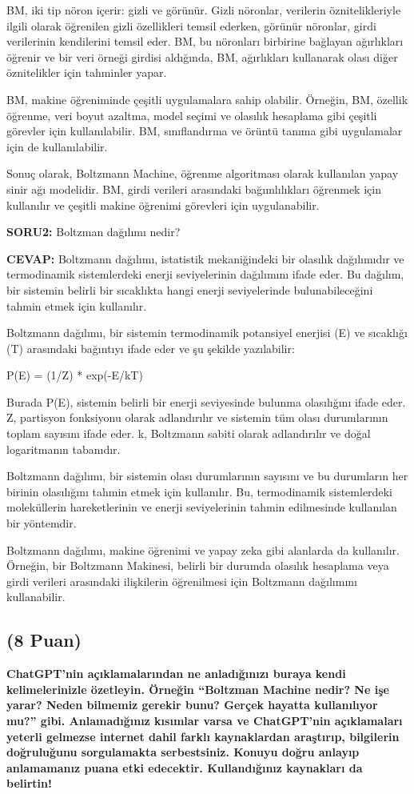 \documentclass[11pt]{article}
\begin{document}
BM, iki tip nöron içerir: gizli ve görünür. Gizli nöronlar, verilerin öznitelikleriyle ilgili olarak öğrenilen gizli özellikleri temsil ederken, görünür nöronlar, girdi verilerinin kendilerini temsil eder. BM, bu nöronları birbirine bağlayan ağırlıkları öğrenir ve bir veri örneği girdisi aldığında, BM, ağırlıkları kullanarak olası diğer öznitelikler için tahminler yapar.

BM, makine öğreniminde çeşitli uygulamalara sahip olabilir. Örneğin, BM, özellik öğrenme, veri boyut azaltma, model seçimi ve olasılık hesaplama gibi çeşitli görevler için kullanılabilir. BM, sınıflandırma ve örüntü tanıma gibi uygulamalar için de kullanılabilir.

Sonuç olarak, Boltzmann Machine, öğrenme algoritması olarak kullanılan yapay sinir ağı modelidir. BM, girdi verileri arasındaki bağımlılıkları öğrenmek için kullanılır ve çeşitli makine öğrenimi görevleri için uygulanabilir.

\textbf{SORU2:} Boltzman dağılımı nedir?

\textbf{CEVAP:} Boltzmann dağılımı, istatistik mekaniğindeki bir olasılık dağılımıdır ve termodinamik sistemlerdeki enerji seviyelerinin dağılımını ifade eder. Bu dağılım, bir sistemin belirli bir sıcaklıkta hangi enerji seviyelerinde bulunabileceğini tahmin etmek için kullanılır.

Boltzmann dağılımı, bir sistemin termodinamik potansiyel enerjisi (E) ve sıcaklığı (T) arasındaki bağıntıyı ifade eder ve şu şekilde yazılabilir:

P(E) = (1/Z) * exp(-E/kT)

Burada P(E), sistemin belirli bir enerji seviyesinde bulunma olasılığını ifade eder. Z, partisyon fonksiyonu olarak adlandırılır ve sistemin tüm olası durumlarının toplam sayısını ifade eder. k, Boltzmann sabiti olarak adlandırılır ve doğal logaritmanın tabanıdır.

Boltzmann dağılımı, bir sistemin olası durumlarının sayısını ve bu durumların her birinin olasılığını tahmin etmek için kullanılır. Bu, termodinamik sistemlerdeki moleküllerin hareketlerinin ve enerji seviyelerinin tahmin edilmesinde kullanılan bir yöntemdir.

Boltzmann dağılımı, makine öğrenimi ve yapay zeka gibi alanlarda da kullanılır. Örneğin, bir Boltzmann Makinesi, belirli bir durumda olasılık hesaplama veya girdi verileri arasındaki ilişkilerin öğrenilmesi için Boltzmann dağılımını kullanabilir.


\subsection{(8 Puan)} \textbf{ChatGPT’nin açıklamalarından ne anladığınızı buraya kendi kelimelerinizle özetleyin. Örneğin ``Boltzman Machine nedir? Ne işe yarar? Neden bilmemiz gerekir bunu? Gerçek hayatta kullanılıyor mu?'' gibi. Anlamadığınız kısımlar varsa ve ChatGPT’nin açıklamaları yeterli gelmezse internet dahil farklı kaynaklardan araştırıp, bilgilerin doğruluğunu sorgulamakta serbestsiniz. Konuyu doğru anlayıp anlamamanız puana etki edecektir. Kullandığınız kaynakları da belirtin!}
\end{document}
